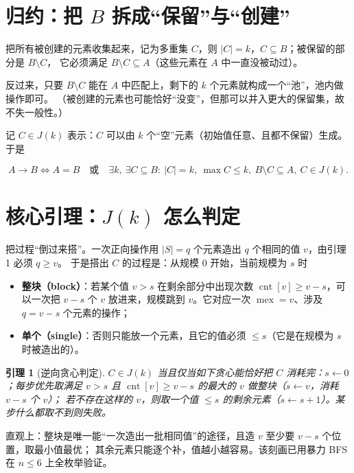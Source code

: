 \documentclass[11pt,a4paper]{article}
\newtheorem{lemma}{引理}
\begin{document}
\section{归约：把 $B$ 拆成“保留”与“创建”}

把所有被创建的元素收集起来，记为多重集 $C$，则 $|C|=k$，$C\subseteq B$；被保留的部分是 $B\setminus C$，
它必须满足 $B\setminus C\subseteq A$（这些元素在 $A$ 中一直没被动过）。

反过来，只要 $B\setminus C$ 能在 $A$ 中匹配上，剩下的 $k$ 个元素就构成一个“池”，池内做操作即可。
（被创建的元素也可能恰好“没变”，但那可以并入更大的保留集，故不失一般性。）

记 $C\in J(k)$ 表示：$C$ 可以由 $k$ 个“空”元素（初始值任意、且都不保留）生成。于是

\[
A\to B
\iff
A=B\quad\text{或}\quad
\exists k,\ \exists C\subseteq B:\ |C|=k,\ \max C\le k,\ B\setminus C\subseteq A,\ C\in J(k).
\]

\section{核心引理：$J(k)$ 怎么判定}

把过程“倒过来搭”。一次正向操作用 $|S|=q$ 个元素造出 $q$ 个相同的值 $v$，由引理 1 必须 $q\ge v$。
于是搭出 $C$ 的过程是：从规模 $0$ 开始，当前规模为 $s$ 时

\begin{itemize}
  \item \textbf{整块（block）}：若某个值 $v>s$ 在剩余部分中出现次数 $\operatorname{cnt}[v]\ge v-s$，可以一次把
        $v-s$ 个 $v$ 放进来，规模跳到 $v$。它对应一次 $\operatorname{mex}=v$、涉及 $q=v-s$ 个元素的操作；
  \item \textbf{单个（single）}：否则只能放一个元素，且它的值必须 $\le s$（它是在规模为 $s$ 时被造出的）。
\end{itemize}

\begin{lemma}[逆向贪心判定]
$C\in J(k)$ 当且仅当如下贪心能恰好把 $C$ 消耗完：$s\leftarrow 0$；每步\emph{优先}取满足
$v>s$ 且 $\operatorname{cnt}[v]\ge v-s$ 的\emph{最大}的 $v$ 做整块（$s\leftarrow v$，消耗 $v-s$ 个 $v$）；
若不存在这样的 $v$，则取一个值 $\le s$ 的剩余元素（$s\leftarrow s+1$）。某步什么都取不到则失败。
\end{lemma}

直观上：整块是唯一能“一次造出一批相同值”的途径，且造 $v$ 至少要 $v-s$ 个位置，取最小值最优；
其余元素只能逐个补，值越小越容易。该刻画已用暴力 BFS 在 $n\le 6$ 上全枚举验证。
\end{document}
